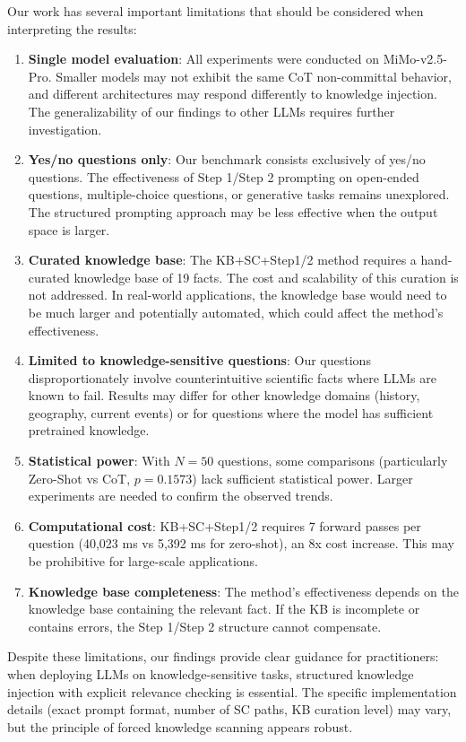 Our work has several important limitations that should be considered when interpreting the results:

\begin{enumerate}
\item \textbf{Single model evaluation}: All experiments were conducted on MiMo-v2.5-Pro. Smaller models may not exhibit the same CoT non-committal behavior, and different architectures may respond differently to knowledge injection. The generalizability of our findings to other LLMs requires further investigation.

\item \textbf{Yes/no questions only}: Our benchmark consists exclusively of yes/no questions. The effectiveness of Step 1/Step 2 prompting on open-ended questions, multiple-choice questions, or generative tasks remains unexplored. The structured prompting approach may be less effective when the output space is larger.

\item \textbf{Curated knowledge base}: The KB+SC+Step1/2 method requires a hand-curated knowledge base of 19 facts. The cost and scalability of this curation is not addressed. In real-world applications, the knowledge base would need to be much larger and potentially automated, which could affect the method's effectiveness.

\item \textbf{Limited to knowledge-sensitive questions}: Our questions disproportionately involve counterintuitive scientific facts where LLMs are known to fail. Results may differ for other knowledge domains (history, geography, current events) or for questions where the model has sufficient pretrained knowledge.

\item \textbf{Statistical power}: With $N=50$ questions, some comparisons (particularly Zero-Shot vs CoT, $p=0.1573$) lack sufficient statistical power. Larger experiments are needed to confirm the observed trends.

\item \textbf{Computational cost}: KB+SC+Step1/2 requires 7 forward passes per question (40,023 ms vs 5,392 ms for zero-shot), an 8x cost increase. This may be prohibitive for large-scale applications.

\item \textbf{Knowledge base completeness}: The method's effectiveness depends on the knowledge base containing the relevant fact. If the KB is incomplete or contains errors, the Step 1/Step 2 structure cannot compensate.
\end{enumerate}

Despite these limitations, our findings provide clear guidance for practitioners: when deploying LLMs on knowledge-sensitive tasks, structured knowledge injection with explicit relevance checking is essential. The specific implementation details (exact prompt format, number of SC paths, KB curation level) may vary, but the principle of forced knowledge scanning appears robust.

